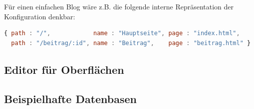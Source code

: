 Für einen einfachen Blog wäre z.B. die folgende interne Repräsentation der Konfiguration denkbar:

\begin{lstlisting}[language=JavaScript, caption=Einfache Routen für einen Blog, label=lst:json:simple-routing-blog]
{ path : "/",            name : "Hauptseite", page : "index.html",
  path : "/beitrag/:id", name : "Beitrag",    page : "beitrag.html" }
\end{lstlisting}

\subsection{Editor für Oberflächen}
\label{sec:design-ui-editor}

\subsection{Beispielhafte Datenbasen}
\label{sec:example-queries}

